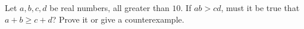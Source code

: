 Let $a,b,c,d$ be real numbers, all greater than $10$. If $ab>cd$, must it be true that $a+b\ge c+d$? Prove it or give a counterexample.
